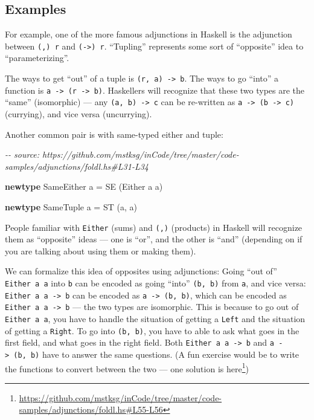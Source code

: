 \documentclass[]{article}
\newenvironment{Shaded}{}{}
\newcommand{\CommentTok}[1]{\textcolor[rgb]{0.38,0.63,0.69}{\textit{#1}}}
\newcommand{\DataTypeTok}[1]{\textcolor[rgb]{0.56,0.13,0.00}{#1}}
\newcommand{\KeywordTok}[1]{\textcolor[rgb]{0.00,0.44,0.13}{\textbf{#1}}}
\newcommand{\NormalTok}[1]{#1}
\newcommand{\OtherTok}[1]{\textcolor[rgb]{0.00,0.44,0.13}{#1}}
\renewcommand{\href}[2]{#2\footnote{\url{#1}}}
\begin{document}
\subsection{Examples}\label{examples}

For example, one of the more famous adjunctions in Haskell is the adjunction
between \texttt{(,)\ r} and \texttt{(-\textgreater{})\ r}. ``Tupling''
represents some sort of ``opposite'' idea to ``parameterizing''.

The ways to get ``out'' of a tuple is \texttt{(r,\ a)\ -\textgreater{}\ b}. The
ways to go ``into'' a function is
\texttt{a\ -\textgreater{}\ (r\ -\textgreater{}\ b)}. Haskellers will recognize
that these two types are the ``same'' (isomorphic) --- any
\texttt{(a,\ b)\ -\textgreater{}\ c} can be re-written as
\texttt{a\ -\textgreater{}\ (b\ -\textgreater{}\ c)} (currying), and vice versa
(uncurrying).

Another common pair is with same-typed either and tuple:

\begin{Shaded}
\begin{Highlighting}[]
\CommentTok{{-}{-} source: https://github.com/mstksg/inCode/tree/master/code{-}samples/adjunctions/foldl.hs\#L31{-}L34}

\KeywordTok{newtype} \DataTypeTok{SameEither}\NormalTok{ a }\OtherTok{=} \DataTypeTok{SE}\NormalTok{ (}\DataTypeTok{Either}\NormalTok{ a a)}

\KeywordTok{newtype} \DataTypeTok{SameTuple}\NormalTok{  a }\OtherTok{=} \DataTypeTok{ST}\NormalTok{ (a, a)}
\end{Highlighting}
\end{Shaded}

People familiar with \texttt{Either} (sums) and \texttt{(,)} (products) in
Haskell will recognize them as ``opposite'' ideas --- one is ``or'', and the
other is ``and'' (depending on if you are talking about using them or making
them).

We can formalize this idea of opposites using adjunctions: Going ``out of''
\texttt{Either\ a\ a} into \texttt{b} can be encoded as going ``into''
\texttt{(b,\ b)} from \texttt{a}, and vice versa:
\texttt{Either\ a\ a\ -\textgreater{}\ b} can be encoded as
\texttt{a\ -\textgreater{}\ (b,\ b)}, which can be encoded as
\texttt{Either\ a\ a\ -\textgreater{}\ b} --- the two types are isomorphic. This
is because to go out of \texttt{Either\ a\ a}, you have to handle the situation
of getting a \texttt{Left} and the situation of getting a \texttt{Right}. To go
into \texttt{(b,\ b)}, you have to able to ask what goes in the first field, and
what goes in the right field. Both \texttt{Either\ a\ a\ -\textgreater{}\ b} and
\texttt{a\ -\textgreater{}\ (b,\ b)} have to answer the same questions. (A fun
exercise would be to write the functions to convert between the two ---
\href{https://github.com/mstksg/inCode/tree/master/code-samples/adjunctions/foldl.hs\#L55-L56}{one
solution is here})
\end{document}
